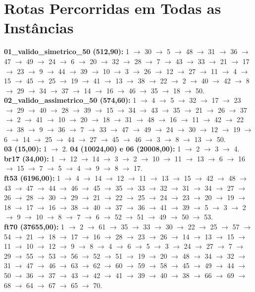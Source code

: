 \documentclass[10pt,a4paper]{article}
\begin{document}
\section{Rotas Percorridas em Todas as Instâncias}
\small
\noindent \textbf{01\_valido\_simetrico\_50 (512,90):} 1 $\to$ 30 $\to$ 5 $\to$ 48 $\to$ 31 $\to$ 36 $\to$ 47 $\to$ 49 $\to$ 24 $\to$ 6 $\to$ 20 $\to$ 32 $\to$ 28 $\to$ 7 $\to$ 43 $\to$ 33 $\to$ 21 $\to$ 17 $\to$ 23 $\to$ 9 $\to$ 44 $\to$ 39 $\to$ 10 $\to$ 3 $\to$ 26 $\to$ 12 $\to$ 27 $\to$ 11 $\to$ 4 $\to$ 15 $\to$ 45 $\to$ 25 $\to$ 19 $\to$ 41 $\to$ 13 $\to$ 38 $\to$ 22 $\to$ 2 $\to$ 40 $\to$ 42 $\to$ 8 $\to$ 29 $\to$ 34 $\to$ 37 $\to$ 14 $\to$ 16 $\to$ 46 $\to$ 35 $\to$ 18 $\to$ 50. \\
\textbf{02\_valido\_assimetrico\_50 (574,60):} 1 $\to$ 4 $\to$ 5 $\to$ 32 $\to$ 17 $\to$ 23 $\to$ 29 $\to$ 40 $\to$ 28 $\to$ 39 $\to$ 15 $\to$ 34 $\to$ 43 $\to$ 35 $\to$ 21 $\to$ 26 $\to$ 37 $\to$ 2 $\to$ 41 $\to$ 10 $\to$ 20 $\to$ 18 $\to$ 31 $\to$ 48 $\to$ 16 $\to$ 11 $\to$ 42 $\to$ 22 $\to$ 38 $\to$ 9 $\to$ 36 $\to$ 7 $\to$ 33 $\to$ 47 $\to$ 49 $\to$ 24 $\to$ 30 $\to$ 12 $\to$ 19 $\to$ 6 $\to$ 14 $\to$ 25 $\to$ 44 $\to$ 27 $\to$ 45 $\to$ 46 $\to$ 3 $\to$ 8 $\to$ 13 $\to$ 50. \\
\textbf{03 (15,00):} 1 $\to$ 2. \quad \textbf{04 (10024,00) e 06 (20008,00):} 1 $\to$ 2 $\to$ 3 $\to$ 4. \\
\textbf{br17 (34,00):} 1 $\to$ 12 $\to$ 14 $\to$ 3 $\to$ 2 $\to$ 10 $\to$ 11 $\to$ 13 $\to$ 6 $\to$ 16 $\to$ 15 $\to$ 7 $\to$ 5 $\to$ 4 $\to$ 9 $\to$ 8 $\to$ 17. \\
\textbf{ft53 (6196,00):} 1 $\to$ 4 $\to$ 14 $\to$ 12 $\to$ 11 $\to$ 13 $\to$ 15 $\to$ 42 $\to$ 48 $\to$ 43 $\to$ 47 $\to$ 44 $\to$ 46 $\to$ 45 $\to$ 35 $\to$ 33 $\to$ 32 $\to$ 31 $\to$ 34 $\to$ 27 $\to$ 26 $\to$ 28 $\to$ 30 $\to$ 29 $\to$ 21 $\to$ 22 $\to$ 25 $\to$ 24 $\to$ 23 $\to$ 20 $\to$ 19 $\to$ 18 $\to$ 17 $\to$ 16 $\to$ 38 $\to$ 40 $\to$ 37 $\to$ 36 $\to$ 41 $\to$ 39 $\to$ 5 $\to$ 3 $\to$ 2 $\to$ 9 $\to$ 10 $\to$ 8 $\to$ 7 $\to$ 6 $\to$ 52 $\to$ 51 $\to$ 49 $\to$ 50 $\to$ 53. \\
\textbf{ft70 (37655,00):} 1 $\to$ 2 $\to$ 61 $\to$ 35 $\to$ 33 $\to$ 30 $\to$ 22 $\to$ 25 $\to$ 57 $\to$ 54 $\to$ 21 $\to$ 18 $\to$ 17 $\to$ 16 $\to$ 28 $\to$ 23 $\to$ 26 $\to$ 14 $\to$ 13 $\to$ 15 $\to$ 11 $\to$ 10 $\to$ 12 $\to$ 9 $\to$ 8 $\to$ 4 $\to$ 6 $\to$ 5 $\to$ 3 $\to$ 24 $\to$ 27 $\to$ 7 $\to$ 29 $\to$ 55 $\to$ 53 $\to$ 56 $\to$ 52 $\to$ 51 $\to$ 19 $\to$ 20 $\to$ 48 $\to$ 34 $\to$ 32 $\to$ 31 $\to$ 47 $\to$ 46 $\to$ 63 $\to$ 62 $\to$ 60 $\to$ 59 $\to$ 58 $\to$ 45 $\to$ 49 $\to$ 44 $\to$ 50 $\to$ 36 $\to$ 37 $\to$ 43 $\to$ 42 $\to$ 41 $\to$ 39 $\to$ 40 $\to$ 38 $\to$ 66 $\to$ 69 $\to$ 68 $\to$ 64 $\to$ 67 $\to$ 65 $\to$ 70. \\
\end{document}
